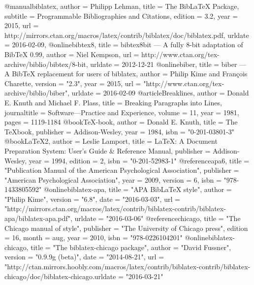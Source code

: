 @manual{biblatex,
author = {Philipp Lehman},
title = {The {Bib\LaTeX} Package},
subtitle = {Programmable Bibliographies and Citations},
edition = {3.2},
year = 2015,
url = {http://mirrors.ctan.org/macros/latex/contrib/biblatex/doc/biblatex.pdf},
urldate = {2016-02-09},
}
@online{bibtex8,
title = {bibtex8bit --- A fully 8-bit adaptation of BibTeX 0.99},
author = {Niel Kempson},
url = {http://www.ctan.org/tex-archive/biblio/bibtex/8-bit},
urldate = {2012-12-21}
}
@online{biber,
title = {biber --- A BibTeX replacement for users of biblatex},
author = {Philip Kime and François Charette},
version = "2.3",
year = 2015,
url = "http://www.ctan.org/tex-archive/biblio/biber",
urldate = {2016-02-09}
}
@article{Breaklines,
author = {Donald E. Knuth and Michael F. Plass},
title = {Breaking Paragraphs into Lines},
journaltitle = {Software---Practice and Experience},
volume = 11,
year = 1981,
pages = {1119-1184}
}
@book{TeX-book,
author = {Donald E. Knuth},
title = {The {\TeX}book},
publisher = {Addison-Wesley},
year = 1984,
isbn = "0-201-03801-3"
}
@book{LaTeX2,
author = {Leslie Lamport},
title = {{\LaTeX}: A Document Preparation System: User’s
Guide & Reference Manual},
publisher = {Addison-Wesley},
year = 1994,
edition = 2,
isbn = "0-201-52983-1"
}
@reference{apa6,
title = "Publication Manual of the
{American Psychological Association}",
publisher = "American Psychological Association",
year = 2009,
version = 6,
isbn = "978-1433805592"
}
@online{biblatex-apa,
title = "{APA Bib\LaTeX{} style}",
author = "Philip Kime",
version = "6.8",
date = "2016-03-03",
url = "http://mirrors.ctan.org/macros/latex/contrib/biblatex-contrib/biblatex-apa/biblatex-apa.pdf",
urldate = "2016-03-06"
}
@reference{chicago,
title = "The {C}hicago manual of style",
publisher = "The University of {C}hicago press",
edition = 16,
month = aug,
year = 2010,
isbn = "978-0226104201"
}
@online{biblatex-chicago,
title = "The biblatex-chicago package",
author = "David Fussner",
version = "0.9.9g (beta)",
date = "2014-08-21",
url = "http://ctan.mirrors.hoobly.com/macros/latex/contrib/biblatex-contrib/biblatex-chicago/doc/biblatex-chicago.urldate = "2016-03-21"
}